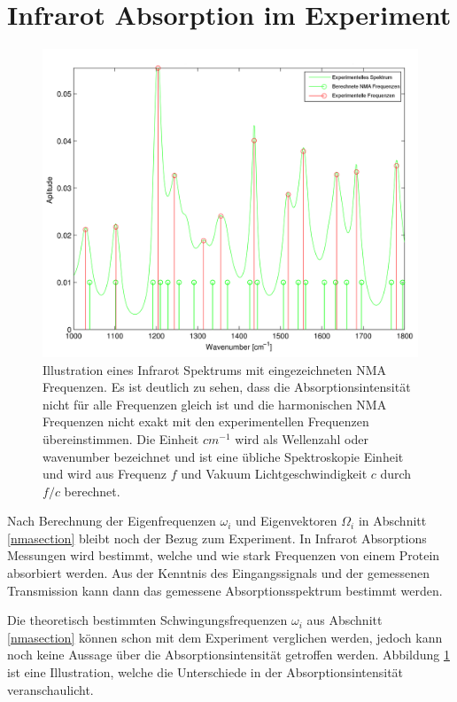 \documentclass[a4paper,12pt]{article}
\begin{document}
\section{Infrarot Absorption im Experiment}
\begin{figure}[ht!]
 \centering
 \includegraphics[scale=0.2,keepaspectratio=true]{./spektrum_exp_nma.png}
 \caption{Illustration eines Infrarot Spektrums mit eingezeichneten NMA Frequenzen. Es ist deutlich zu sehen, dass die Absorptionsintensität nicht für alle Frequenzen gleich ist und die harmonischen 
  NMA Frequenzen nicht exakt mit den experimentellen Frequenzen übereinstimmen.
  Die Einheit $cm^{-1}$ wird als Wellenzahl oder wavenumber bezeichnet und ist eine übliche Spektroskopie Einheit und wird aus Frequenz $f$ und Vakuum Lichtgeschwindigkeit $c$ durch $f/c$ berechnet. 
  }
 \label{fig:nma_exp_comp}
\end{figure}
Nach Berechnung der Eigenfrequenzen $\omega_i$ und Eigenvektoren $\Omega_i$ in Abschnitt \ref{nmasection} bleibt noch der Bezug zum 
Experiment. In Infrarot Absorptions Messungen wird bestimmt, welche und wie stark Frequenzen von einem Protein absorbiert werden. Aus
der Kenntnis des Eingangssignals und der gemessenen Transmission kann dann das gemessene Absorptionsspektrum bestimmt werden. 

Die theoretisch bestimmten Schwingungsfrequenzen $\omega_i$ aus Abschnitt \ref{nmasection} können schon mit dem Experiment verglichen 
werden, jedoch kann noch keine Aussage über die Absorptionsintensität getroffen werden. Abbildung \ref{fig:nma_exp_comp} ist eine Illustration,
welche die Unterschiede in der Absorptionsintensität veranschaulicht.
\end{document}

